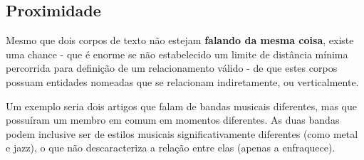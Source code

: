 \subsection{Proximidade}

Mesmo que dois corpos de texto não estejam \textbf{falando da mesma coisa}, existe uma chance - que é enorme se não estabelecido um limite de distância mínima percorrida para definição de um relacionamento válido - de que estes corpos possuam entidades nomeadas que se relacionam indiretamente, ou verticalmente.

Um exemplo seria dois artigos que falam de bandas musicais diferentes, mas que possuíram um membro em comum em momentos diferentes. As duas bandas podem inclusive ser de estilos musicais significativamente diferentes (como metal e jazz), o que não descaracteriza a relação entre elas (apenas a enfraquece).